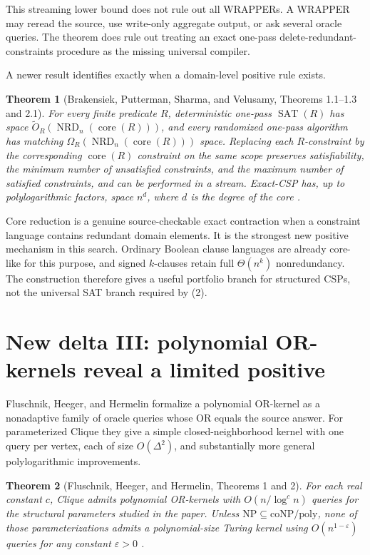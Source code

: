 \documentclass[11pt]{article}
\newtheorem{theorem}{Theorem}
\newcommand{\SAT}{\operatorname{SAT}}
\begin{document}
This streaming lower bound does not rule out all WRAPPERs.  A WRAPPER may
reread the source, use write-only aggregate output, or ask several oracle
queries.  The theorem does rule out treating an exact one-pass
delete-redundant-constraints procedure as the missing universal compiler.

A newer result identifies exactly when a domain-level positive rule exists.

\begin{theorem}[Brakensiek, Putterman, Sharma, and Velusamy, Theorems
1.1--1.3 and 2.1]
For every finite predicate $R$, deterministic one-pass
$\SAT(R)$ has space
$\widetilde O_R(\operatorname{NRD}_n(\operatorname{core}(R)))$, and every
randomized one-pass algorithm has matching
$\Omega_R(\operatorname{NRD}_n(\operatorname{core}(R)))$ space.  Replacing
each $R$-constraint by the corresponding $\operatorname{core}(R)$ constraint
on the same scope preserves satisfiability, the minimum number of
unsatisfied constraints, and the maximum number of satisfied constraints,
and can be performed in a stream.  Exact-CSP has, up to polylogarithmic
factors, space $n^d$, where $d$ is the degree of the core
\cite{brakensiekputtermansharmavelusamy2026}.
\end{theorem}

Core reduction is a genuine source-checkable exact contraction when a
constraint language contains redundant domain elements.  It is the
strongest new positive mechanism in this search.  Ordinary Boolean clause
languages are already core-like for this purpose, and signed $k$-clauses
retain full $\Theta(n^k)$ nonredundancy.  The construction therefore gives
a useful portfolio branch for structured CSPs, not the universal SAT
branch required by (2).

\section{New delta III: polynomial OR-kernels reveal a limited positive}

Fluschnik, Heeger, and Hermelin formalize a polynomial OR-kernel as a
nonadaptive family of oracle queries whose OR equals the source answer.
For parameterized Clique they give a simple closed-neighborhood kernel with
one query per vertex, each of size $O(\Delta^2)$, and substantially more
general polylogarithmic improvements.

\begin{theorem}[Fluschnik, Heeger, and Hermelin, Theorems 1 and 2]
For each real constant $c$, Clique admits polynomial OR-kernels with
$O(n/\log^c n)$ queries for the structural parameters studied in the paper.
Unless $\mathrm{NP}\subseteq\mathrm{coNP/poly}$, none of those
parameterizations admits a polynomial-size Turing kernel using
$O(n^{1-\varepsilon})$ queries for any constant $\varepsilon>0$
\cite{fluschnikheegerhermelin2022}.
\end{theorem}
\end{document}
